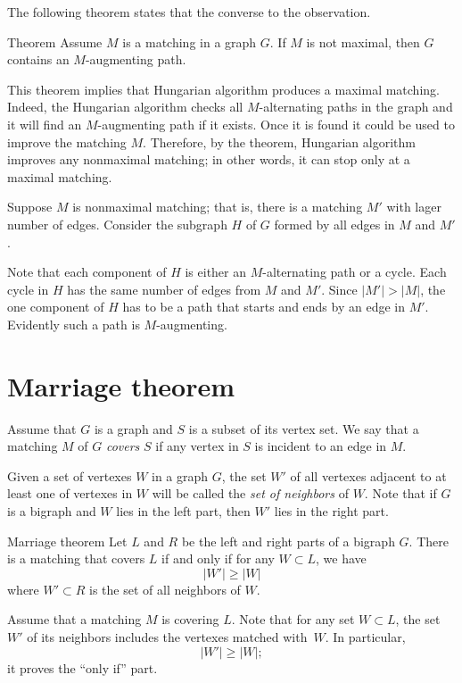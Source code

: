 The following theorem states that the converse to the observation.

\begin{thm}{Theorem}
Assume $M$ is a matching in a graph $G$.
If $M$ is not maximal, then $G$ contains an $M$-augmenting path.
\end{thm}

This theorem implies that Hungarian algorithm \cite[Section 7.2]{hartsfield-ringel} produces a maximal matching.
Indeed, the Hungarian algorithm checks all $M$-alternating paths in the graph and it will find an $M$-augmenting path if it exists.
Once it is found it could be used to improve the matching $M$.
Therefore, by the theorem, Hungarian algorithm improves any nonmaximal matching;
in other words, it can stop only at a maximal matching.

Suppose $M$ is nonmaximal matching; that is, there is a matching $M'$ with lager number of edges.
Consider the subgraph $H$ of $G$ formed by all edges in $M$ and $M'$.

Note that each component of $H$ is either an $M$-alternating path or a cycle.
Each cycle in $H$ has the same number of edges from $M$ and $M'$.
Since $|M'|>|M|$, the one component of $H$ has to be a path that starts and ends by an edge in $M'$.
Evidently such a path is $M$-augmenting.
\qeds

\section*{Marriage theorem}

Assume that $G$ is a graph and $S$ is a subset of its vertex set.
We say that a matching $M$ of $G$ {}\emph{covers} $S$ if any vertex in $S$ is incident to an edge in $M$.

Given a set of vertexes $W$ in a graph $G$, the set $W'$ of all vertexes  adjacent to at least one of vertexes in $W$ will be called the \emph{set of neighbors} of $W$.
Note that if $G$ is a bigraph and $W$ lies in the left part, then $W'$ lies in the right part. 

\begin{thm}{Marriage theorem}
Let $L$ and $R$ be the left and right parts of a bigraph $G$.
There is a matching that covers $L$ if and only if for any $W\subset L$, we have 
\[|W'|\ge |W|\]
where $W'\subset R$ is the set of all neighbors of $W$.

\end{thm}

Assume that a matching $M$ is covering $L$.
Note that for any set  $W\subset L$, the set $W'$ of its neighbors includes the vertexes matched with~$W$.
In particular,
\[|W'|\ge |W|;\]
it proves the ``only if'' part.

